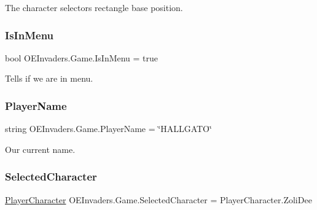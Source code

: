 The character selector\textquotesingle{}s rectangle base position. 

\mbox{\label{class_o_e_invaders_1_1_game_a114778007490c8fd9134ddd5acaac808}} 
\subsubsection{\texorpdfstring{IsInMenu}{IsInMenu}}
{\footnotesize\ttfamily bool O\+E\+Invaders.\+Game.\+Is\+In\+Menu = true\hspace{0.3cm}{\ttfamily [static]}}



Tells if we are in menu. 

\mbox{\label{class_o_e_invaders_1_1_game_a627772f162c781b3280353c111eada3b}} 
\subsubsection{\texorpdfstring{PlayerName}{PlayerName}}
{\footnotesize\ttfamily string O\+E\+Invaders.\+Game.\+Player\+Name = \char`\"{}H\+A\+L\+L\+G\+A\+TO\char`\"{}\hspace{0.3cm}{\ttfamily [static]}}



Our current name. 

\mbox{\label{class_o_e_invaders_1_1_game_a3bbb06cdfd105f4afc89bc00890a19ef}} 
\subsubsection{\texorpdfstring{SelectedCharacter}{SelectedCharacter}}
{\footnotesize\ttfamily \mbox{\hyperlink{namespace_o_e_invaders_1_1_library_ad161194088b9101570c071d1baa1d2c7}{Player\+Character}} O\+E\+Invaders.\+Game.\+Selected\+Character = Player\+Character.\+Zoli\+Dee\hspace{0.3cm}{\ttfamily [static]}}



